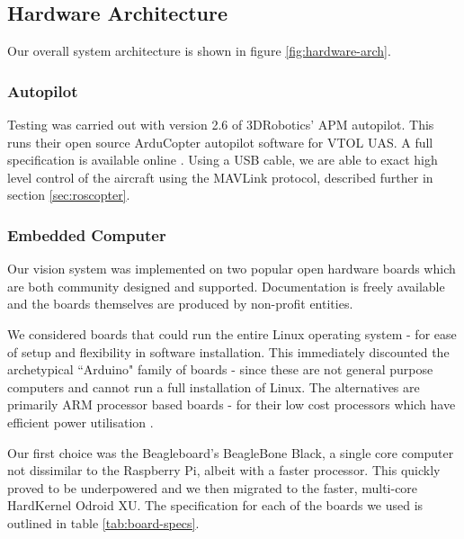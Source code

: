 \documentclass{acm_proc_article-sp}
\begin{document}
\subsection{Hardware Architecture}

Our overall system architecture is shown in figure \ref{fig:hardware-arch}.

\subsubsection{Autopilot}
Testing was carried out with version 2.6 of 3DRobotics' APM autopilot. This runs their open source ArduCopter autopilot software for VTOL UAS. A full specification is available online \cite{arducopter}. Using a USB cable, we are able to exact high level control of the aircraft using the MAVLink protocol, described further in section \ref{sec:roscopter}.

\subsubsection{Embedded Computer}
Our vision system was implemented on two popular open hardware boards which are both community designed and supported. Documentation is freely available and the boards themselves are produced by non-profit entities. 

We considered boards that could run the entire Linux operating system - for ease of setup and flexibility in software installation. This immediately discounted the archetypical ``Arduino" family of boards - since these are not general purpose computers and cannot run a full installation of Linux. The alternatives are primarily ARM processor based boards - for their low cost processors which have efficient power utilisation \cite{roberts2009arm}.

Our first choice was the Beagleboard's BeagleBone Black, a single core computer not dissimilar to the Raspberry Pi, albeit with a faster processor. This quickly proved to be underpowered and we then migrated to the faster, multi-core HardKernel Odroid XU. The specification for each of the boards we used is outlined in table \ref{tab:board-specs}.
\end{document}
